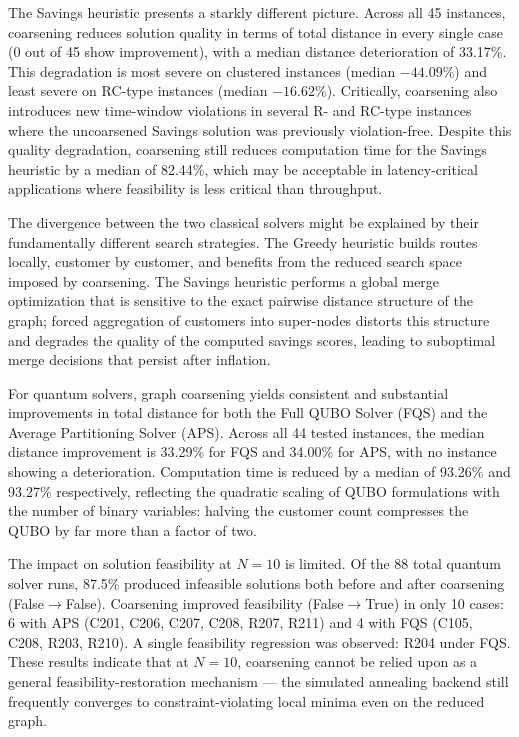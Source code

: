 \documentclass[conference]{IEEEtran}
\begin{document}
The Savings heuristic presents a starkly different picture. Across all 45 instances, coarsening reduces solution quality in terms of total distance in every single case (0 out of 45 show improvement), with a median distance deterioration of 33.17\%. This degradation is most severe on clustered instances (median $-44.09\%$) and least severe on RC-type instances (median $-16.62\%$). Critically, coarsening also introduces new time-window violations in several R- and RC-type instances where the uncoarsened Savings solution was previously violation-free. Despite this quality degradation, coarsening still reduces computation time for the Savings heuristic by a median of 82.44\%, which may be acceptable in latency-critical applications where feasibility is less critical than throughput.

The divergence between the two classical solvers might be explained by their fundamentally different search strategies. The Greedy heuristic builds routes locally, customer by customer, and benefits from the reduced search space imposed by coarsening. The Savings heuristic performs a global merge optimization that is sensitive to the exact pairwise distance structure of the graph; forced aggregation of customers into super-nodes distorts this structure and degrades the quality of the computed savings scores, leading to suboptimal merge decisions that persist after inflation.

For quantum solvers, graph coarsening yields consistent and substantial improvements in total distance for both the Full QUBO Solver (FQS) and the Average Partitioning Solver (APS). Across all 44 tested instances, the median distance improvement is 33.29\% for FQS and 34.00\% for APS, with no instance showing a deterioration. Computation time is reduced by a median of 93.26\% and 93.27\% respectively, reflecting the quadratic scaling of QUBO formulations with the number of binary variables: halving the customer count compresses the QUBO by far more than a factor of two.

The impact on solution feasibility at $N=10$ is limited. Of the 88 total quantum solver runs, 87.5\% produced infeasible solutions both before and after coarsening (False$\to$False). Coarsening improved feasibility (False$\to$True) in only 10 cases: 6 with APS (C201, C206, C207, C208, R207, R211) and 4 with FQS (C105, C208, R203, R210). A single feasibility regression was observed: R204 under FQS. These results indicate that at $N=10$, coarsening cannot be relied upon as a general feasibility-restoration mechanism — the simulated annealing backend still frequently converges to constraint-violating local minima even on the reduced graph.
\end{document}
